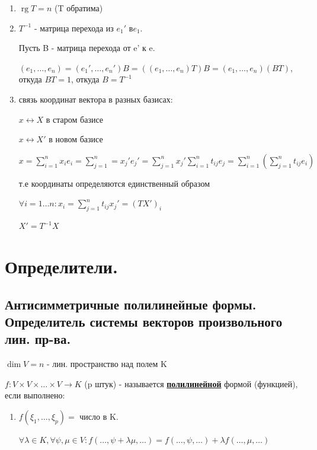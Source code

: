 \documentclass[twoside]{book}
\DeclareMathOperator{\rg}{rg}
\begin{document}
\begin{enumerate}
    \item \(\rg T = n\) (T обратима)


    \item \(T^{-1}\) - матрица перехода из \(e_1'\) в\(e_1\).

          Пусть B - матрица перехода от e' к e.

          \((e_1,\ldots,e_n) = (e_1',\ldots,e_n')B = ((e_1,\ldots,e_n)T)B = (e_1,\ldots,e_n) (BT)\), откуда \(BT = 1\),  откуда  \(B = T^{-1}\)


    \item связь координат вектора в разных базисах:

          \(x \leftrightarrow X\) в старом базисе

          \(x \leftrightarrow X'\) в новом базисе

          \(x = \sum\limits_{i=1}^n x_i e_i  = \sum \limits_{j=1}^n = x_j'e_j' = \sum\limits_{j=1}^n x_j' \sum\limits_{i=1}^n t_{ij} e_j = \sum\limits_{i=1}^n (\sum\limits_{j=1}^n t_{ij} e_i)\)

          т.е координаты определяются единственный образом

          \(\forall i = 1\ldots n: x_i =\sum\limits_{j=1}^n t_{ij} x_j' = (TX')_i\)

          \(X' = T^{-1} X\)
\end{enumerate}

\section{Определители.}

\subsection{Антисимметричные полилинейные формы. Определитель системы векторов произвольного лин. пр-ва.}

\(\dim V = n\) - лин. пространство над полем K

\(f: V \times V \times \ldots \times V \rightarrow K\) (p штук) - называется \uline{\textbf{полилинейной}} формой (функцией), если выполнено:

\begin{enumerate}
    \item[]

          \(f(\xi_1,\ldots,\xi_p) = \) число в K.

          \(\forall \lambda \in K, \forall \psi, \mu \in V: f(\ldots,\psi + \lambda \mu,\ldots) = f(\ldots, \psi, \ldots) + \lambda f(\ldots,\mu,\ldots)\)
\end{enumerate}
\end{document}
